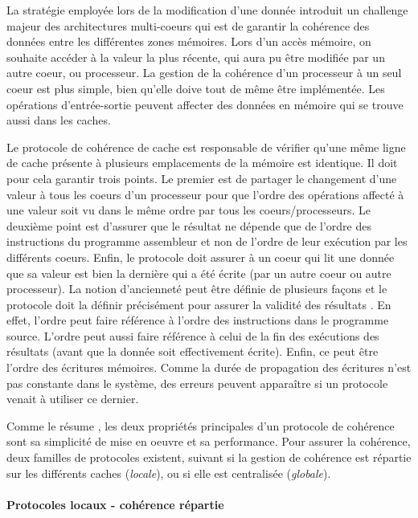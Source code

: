         La stratégie employée lors de la modification d'une donnée introduit un challenge majeur des architectures multi-coeurs qui est de garantir la cohérence des données entre les différentes zones mémoires. Lors d'un accès mémoire, on souhaite accéder à la valeur la plus récente, qui aura pu être modifiée par un autre coeur, ou processeur. La gestion de la cohérence d'un processeur à un seul coeur est plus simple, bien qu'elle doive tout de même être implémentée. Les opérations d'entrée-sortie peuvent affecter des données en mémoire qui se trouve aussi dans les caches.
        
        Le protocole de cohérence de cache est responsable de vérifier qu'une même ligne de cache présente à plusieurs emplacements de la mémoire est identique. Il doit pour cela garantir trois points. Le premier est de partager le changement d'une valeur à tous les coeurs d'un processeur pour que l'ordre des opérations affecté à une valeur soit vu dans le même ordre par tous les coeurs/processeurs. Le deuxième point est d'assurer que le résultat ne dépende que de l'ordre des instructions du programme assembleur et non de l'ordre de leur exécution par les différents coeurs. Enfin, le protocole doit assurer à un coeur qui lit une donnée que sa valeur est bien la dernière qui a été écrite (par un autre coeur ou autre processeur). La notion d'ancienneté peut être définie de plusieurs façons et le protocole doit la définir précisément pour assurer la validité des résultats \cite{Blanchet2013}. En effet, l'ordre peut faire référence à l'ordre des instructions dans le programme source. L'ordre peut aussi faire référence à celui de la fin des exécutions des résultats (avant que la donnée soit effectivement écrite). Enfin, ce peut être l'ordre des écritures mémoires. Comme la durée de propagation des écritures n'est pas constante dans le système, des erreurs peuvent apparaître si un protocole venait à utiliser ce dernier.
        
        Comme le résume \cite{Blanchet2013}, les deux propriétés principales d'un protocole de cohérence sont sa simplicité de mise en oeuvre et sa performance. Pour assurer la cohérence, deux familles de protocoles existent, suivant si la gestion de cohérence est répartie sur les différents caches (\textit{locale}), ou si elle est centralisée (\textit{globale}). 
        
        
        \paragraph{Protocoles locaux - cohérence répartie}
        
